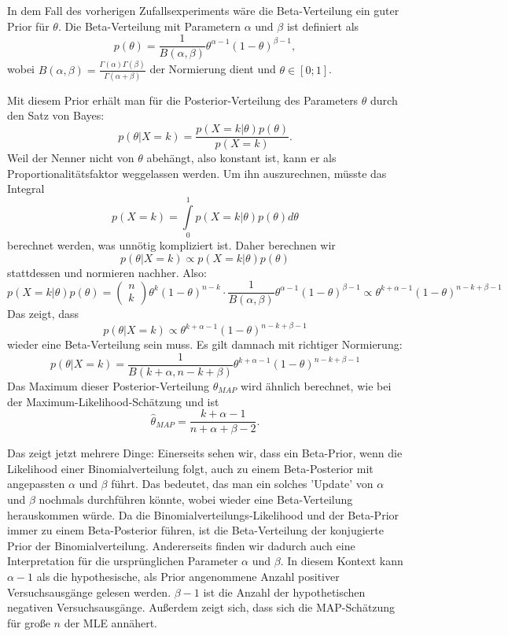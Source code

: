 \documentclass{article}
\begin{document}
In dem Fall des vorherigen Zufallsexperiments wäre die Beta-Verteilung ein guter Prior für \(\theta\). Die Beta-Verteilung mit Parametern \(\alpha\) und \(\beta\) ist definiert als\[
p(\theta)=\frac1{B(\alpha,\beta)}\theta^{\alpha-1}(1-\theta)^{\beta-1},
\]wobei \(B(\alpha,\beta)=\frac{\Gamma(\alpha)\Gamma(\beta)}{\Gamma(\alpha+\beta)}\) der Normierung dient und \(\theta\in[0;1]\).

Mit diesem Prior erhält man für die Posterior-Verteilung des Parameters \(\theta\) durch den Satz von Bayes:
\[
    p(\theta|X=k)=\frac{p(X=k|\theta)p(\theta)}{p(X=k)}.
\] Weil der Nenner nicht von \(\theta\) abehängt, also konstant ist, kann er als Proportionalitätsfaktor weggelassen werden. Um ihn auszurechnen, müsste das Integral \[
p(X=k)=\int\limits_0^1p(X=k|\theta)p(\theta)d\theta
\]berechnet werden, was unnötig kompliziert ist. Daher berechnen wir\[
    p(\theta|X=k)\propto p(X=k|\theta)p(\theta)
\] stattdessen und normieren nachher. Also:\[
    p(X=k|\theta)p(\theta)=\begin{pmatrix}
        n\\k
    \end{pmatrix}\theta^k(1-\theta)^{n-k}\cdot\frac1{B(\alpha,\beta)}\theta^{\alpha-1}(1-\theta)^{\beta-1}\propto \theta^{k+\alpha-1}(1-\theta)^{n-k+\beta-1}
\]Das zeigt, dass\[
p(\theta|X=k)\propto \theta^{k+\alpha-1}(1-\theta)^{n-k+\beta-1}
\]wieder eine Beta-Verteilung sein muss. Es gilt damnach mit richtiger Normierung:\[
p(\theta|X=k)=\frac1{B(k+\alpha,n-k+\beta)}\theta^{k+\alpha-1}(1-\theta)^{n-k+\beta-1}
\]Das Maximum dieser Posterior-Verteilung \(\hat\theta_{MAP}\) wird ähnlich berechnet, wie bei der Maximum-Likelihood-Schätzung und ist\[
\hat\theta_{MAP}=\frac{k+\alpha-1}{n+\alpha+\beta-2}.
\]

Das zeigt jetzt mehrere Dinge: Einerseits sehen wir, dass ein Beta-Prior, wenn die Likelihood einer Binomialverteilung folgt, auch zu einem Beta-Posterior mit angepassten \(\alpha\) und \(\beta\) führt. Das bedeutet, das man ein solches 'Update' von \(\alpha\) und \(\beta\) nochmals durchführen könnte, wobei wieder eine Beta-Verteilung herauskommen würde. Da die Binomialverteilungs-Likelihood und der Beta-Prior immer zu einem Beta-Posterior führen, ist die Beta-Verteilung der konjugierte Prior der Binomialverteilung. Andererseits finden wir dadurch auch eine Interpretation für die ursprünglichen Parameter \(\alpha\) und \(\beta\). In diesem Kontext kann \(\alpha-1\) als die hypothesische, als Prior angenommene Anzahl positiver Versuchsausgänge gelesen werden. \(\beta-1\) ist die Anzahl der hypothetischen negativen Versuchsausgänge. Außerdem zeigt sich, dass sich die MAP-Schätzung für große \(n\) der MLE annähert.
\end{document}
